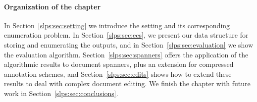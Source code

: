 \paragraph{Organization of the chapter} 
In Section~\ref{slps:sec:setting} we introduce the setting and its corresponding enumeration problem. 
In Section~\ref{slps:sec:ecs}, we present our data structure for storing and enumerating the outputs, and in Section~\ref{slps:sec:evaluation} we show the evaluation algorithm. 
Section~\ref{slps:sec:spanners} offers the application of the algorithmic results to document spanners, plus an extension for compressed annotation schemes, and Section~\ref{slps:sec:edits} shows how to extend these results to deal with complex document editing. 
We finish the chapter with future work in Section~\ref{slps:sec:conclusions}. 
